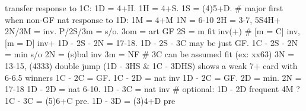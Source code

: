 transfer response to 1C: 1D = 4+H. 1H = 4+S. 1S = (4)5+D. 
    # major first when non-GF
nat response to 1D: 1M = 4+M
1N = 6-10
2H = 3-7, 5S4H+ 
    2N/3M = inv. P/2S/3m = s/o. 3om = art GF
2S = m fit inv(+)  # [m = C] inv, [m = D] inv+
    1D - 2S - 2N = 17-18. 1D - 2S - 3C may be just GF. 1C - 2S - 2N = min s/o
2N = (s)bal inv
    3m = NF  # 3C can be assumed fit (ex: xx63)
3N = 13-15, (4333)
double jump (1D - 3HS & 1C - 3DHS) shows a weak 7+ card with 6-6.5 winners
1C - 2C = GF. 1C - 2D = nat inv
1D - 2C = GF. 
    2D = min. 2N = 17-18
1D - 2D = nat 6-10. 1D - 3C = nat inv
    # optional: 1D - 2D frequent 4M ?
1C - 3C = (5)6+C pre. 1D - 3D = (3)4+D pre